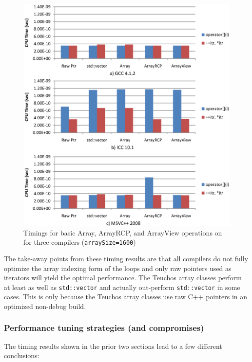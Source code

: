 \documentclass[pdf,ps2pdf,11pt]{SANDreport}
\begin{document}
{\bsinglespace
\begin{figure}
\begin{center}
\includegraphics*[angle=0,scale=1.00]{ArrayTimings}
\end{center}
\caption{
\label{fig:ArrayTimings}
Timings for basic Array, ArrayRCP, and ArrayView operations on for
three compilers ({}\texttt{arraySize=1600})}
\end{figure}
\esinglespace}


The take-away points from these timing results are that all compilers
do not fully optimize the array indexing form of the loops and only
raw pointers used as iterators will yield the optimal performance.
The Teuchos array classes perform at least as well as
{}\texttt{std::vector} and actually out-perform {}\texttt{std::vector}
in some cases.  This is only because the Teuchos array classes use raw
C++ pointers in an optimized non-debug build.


%
{}\subsubsection{Performance tuning strategies (and compromises)}
\label{sec:perf-tuning-strategies}
%

The timing results shown in the prior two sections lead to a few
different conclusions:
\end{document}
